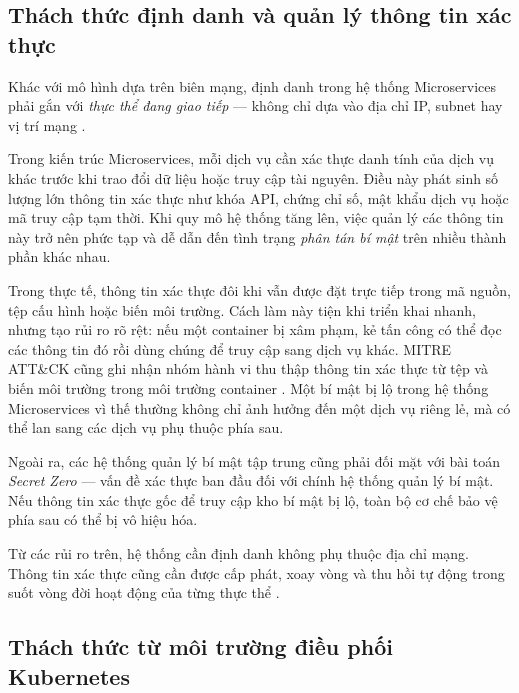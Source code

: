 \subsection{Thách thức định danh và quản lý thông tin xác thực}

Khác với mô hình dựa trên biên mạng, định danh trong hệ thống Microservices phải gắn với \textit{thực thể đang giao tiếp} --- không chỉ dựa vào địa chỉ IP, subnet hay vị trí mạng \parencite{nist800204b_abac_microservices,spiffe_spec}.

Trong kiến trúc Microservices, mỗi dịch vụ cần xác thực danh tính của dịch vụ khác trước khi trao đổi dữ liệu hoặc truy cập tài nguyên. Điều này phát sinh số lượng lớn thông tin xác thực như khóa API, chứng chỉ số, mật khẩu dịch vụ hoặc mã truy cập tạm thời. Khi quy mô hệ thống tăng lên, việc quản lý các thông tin này trở nên phức tạp và dễ dẫn đến tình trạng \textit{phân tán bí mật} trên nhiều thành phần khác nhau.

Trong thực tế, thông tin xác thực đôi khi vẫn được đặt trực tiếp trong mã nguồn, tệp cấu hình hoặc biến môi trường. Cách làm này tiện khi triển khai nhanh, nhưng tạo rủi ro rõ rệt: nếu một container bị xâm phạm, kẻ tấn công có thể đọc các thông tin đó rồi dùng chúng để truy cập sang dịch vụ khác. MITRE ATT\&CK cũng ghi nhận nhóm hành vi thu thập thông tin xác thực từ tệp và biến môi trường trong môi trường container \parencite{mitre_t1552,mitre_containers}. Một bí mật bị lộ trong hệ thống Microservices vì thế thường không chỉ ảnh hưởng đến một dịch vụ riêng lẻ, mà có thể lan sang các dịch vụ phụ thuộc phía sau.

Ngoài ra, các hệ thống quản lý bí mật tập trung cũng phải đối mặt với bài toán \textit{Secret Zero} \parencite{vault_docs} --- vấn đề xác thực ban đầu đối với chính hệ thống quản lý bí mật. Nếu thông tin xác thực gốc để truy cập kho bí mật bị lộ, toàn bộ cơ chế bảo vệ phía sau có thể bị vô hiệu hóa.

Từ các rủi ro trên, hệ thống cần định danh không phụ thuộc địa chỉ mạng. Thông tin xác thực cũng cần được cấp phát, xoay vòng và thu hồi tự động trong suốt vòng đời hoạt động của từng thực thể \parencite{spiffe_spec,vault_docs,machine_identity_report}.

\subsection{Thách thức từ môi trường điều phối Kubernetes}

